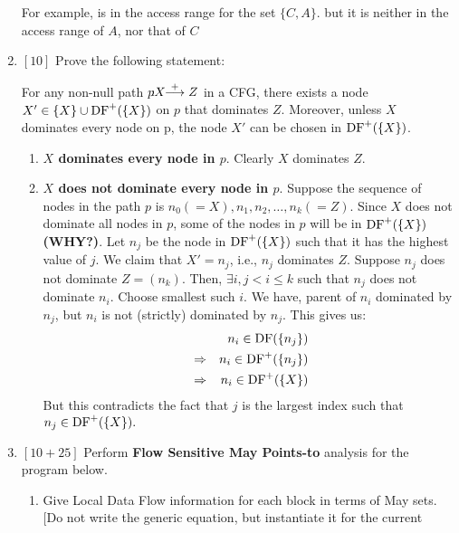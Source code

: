 \documentclass[12pt]{article}
\newcommand{\answer}[1]{{{\blue #1}}}
\begin{document}
\begin{enumerate}
{{
For example,  is in the access range for the set $\{C, A\}$. but it is neither in the access range of $A$, nor that of $C$
}}

\clearpage
\item $[10]$ Prove the following statement:

  For any non-null path $p\!\!\!:\!\! X\!\!\stackrel{+}{\longrightarrow} Z$ in a CFG, there exists a node \linebreak
  $X' \in \{X\} \cup \mbox{DF}^+(\{X\})$ on $p$ that dominates
  $Z$. Moreover, unless $X$ dominates every node on p, the node
  $X'$ can be chosen in $\mbox{DF}^+(\{X\})$.

\answer{
  \begin{enumerate}
  \item {\bf $X$ dominates every node in $p$}. Clearly $X$
    dominates $Z$.
  \item {\bf $X$ does not dominate every node in $p$}. Suppose the sequence of nodes in the path $p$ is $n_0 (=X), n_1, n_2, \ldots, n_k (=Z)$. Since $X$ does not dominate all nodes in $p$, some of the nodes in $p$ will be in $\mbox{DF}^+(\{X\})$ {\bf (WHY?)}. Let $n_j$ be the node in $\mbox{DF}^+(\{X\})$ such that it has the highest value of $j$. We claim that $X' = n_j$, i.e., $n_j$ dominates $Z$.
  Suppose $n_j$ does not dominate $Z = (n_k)$. Then, $\exists i, j < i \leq k$ such that $n_j$ does not dominate $n_i$. Choose smallest such $i$. We have, parent of $n_i$ dominated by $n_j$, but $n_i$ is not (strictly) dominated by $n_j$. This gives us:
  \begin{eqnarray*}
    &&n_i \in \mbox{DF}(\{n_j\})\\
       &\Rightarrow& n_i \in \mbox{DF}^+(\{n_j\})\\
       &\Rightarrow& n_i \in \mbox{DF}^+(\{X\})
  \end{eqnarray*}
But this contradicts the fact that $j$ is the largest index such that $n_j \in \mbox{DF}^+(\{X\}).$
  \end{enumerate}
}
\clearpage
\item $[10 + 25]$ Perform {\bf Flow Sensitive May Points-to}
  analysis for the program below. 
  \begin{enumerate}
  \item Give Local Data Flow information for each block
    in terms of May sets. [Do not write the
      generic equation, but instantiate it for the current

\end{enumerate}
\end{enumerate}
\end{document}
